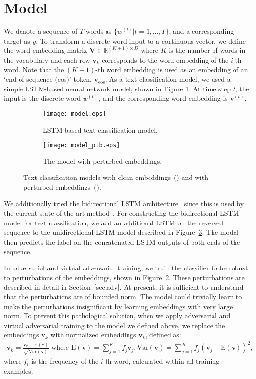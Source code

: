 \documentclass{article}
\newcommand{\vv}{\bm{v}}
\newcommand{\vV}{\bm{V}}
\begin{document}
\section{Model}
\label{sec:model}
We denote a sequence of $T$ words as $\{w^{(t)}|t=1,\dots,T\}$,
and a corresponding target as $y$.
To transform a discrete word input to a continuous vector, we define the
word embedding matrix $\vV\in \mathbb{R}^{(K+1)\times D}$ where $K$
is the number of words in the vocabulary and each row $\vv_k$ corresponds to the word
embedding of the $i$-th word.
Note that the $(K+1)$-th word embedding is used as an embedding of an
`end of sequence (eos)' token, $\vv_{\textrm{eos}}$.
As a text classification model, we used a simple LSTM-based
neural network model, shown in Figure {\ref{fig:model}}.
At time step $t$, the input is the discrete word $w^{(t)}$,
and the corresponding word embedding is $\vv^{(t)}$.
\begin{figure}[ht]
\begin{subfigure}[h]{0.45\textwidth}
			\texttt{[image: model.eps]}
			\caption{\label{fig:model} LSTM-based text classification model.}
	\end{subfigure}
	\hfill
	\begin{subfigure}[h]{0.45\textwidth}
			\texttt{[image: model\_ptb.eps]}
			\caption{\label{fig:model_ptb} The model with perturbed embeddings.}
	\end{subfigure}
\caption{\label{fig:models} Text classification models with clean
	embeddings~() and with perturbed
	embeddings~().}
\end{figure}
We additionally tried the bidirectional LSTM architecture~\cite[]{graves2005framewise} since this is used by the current state of the art
method~\cite[]{johnson2016supervised}.
For constructing the bidirectional LSTM model for text classification, we add an
additional LSTM on the reversed sequence to the unidirectional LSTM model described
in Figure~\ref{fig:models}.
The model then predicts the label on the concatenated LSTM outputs of both ends of the
sequence.

In adversarial and virtual adversarial training, we train the classifier to be
robust to perturbations of the embeddings, shown in
Figure~\ref{fig:model_ptb}.
These perturbations are described in detail in Section~\ref{sec:adv}.
At present, it is sufficient to understand that the perturbations are of bounded
norm.
The model could trivially learn to make the perturbations insignificant by learning
embeddings with very large norm.
To prevent this pathological solution, when we apply adversarial and virtual adversarial training to the model
we defined above, we replace the embeddings $\vv_k$ with normalized embeddings $\bar{\vv}_k$,
defined as:
\begin{align}
	\bar{\vv}_k = \frac{\vv_k - {\mathrm{E}}(\vv)}{ \sqrt{{\mathrm{Var}}(\vv)}}
  	\text{  where  }
	{\mathrm{E}}(\vv) = \sum_{j=1}^{K} f_j \vv_j, 
	{\mathrm{Var}}(\vv) = \sum_{j=1}^{K} f_j \left( \vv_j - {\mathrm{E}}(\vv) \right)^2,
\end{align}
where $f_i$ is the frequency of the $i$-th word, calculated within all training examples.
\end{document}

